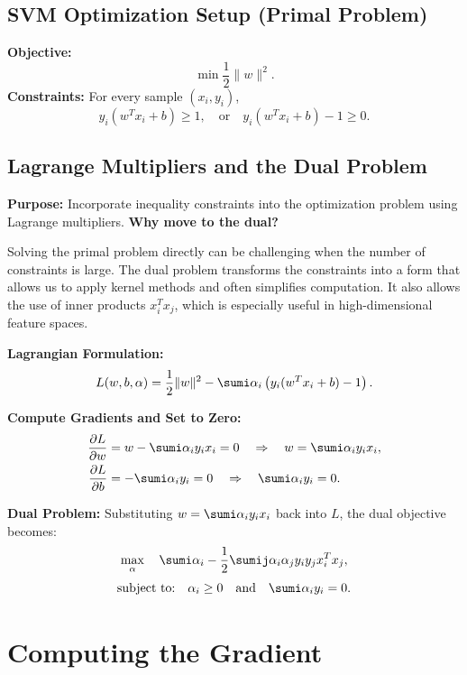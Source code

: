 \subsection{SVM Optimization Setup (Primal Problem)}
\begin{outline}
    \1 \textbf{Objective:}
    \[
    \min \frac{1}{2}\|w\|^2.
    \]
    \1 \textbf{Constraints:} For every sample \((x_i, y_i)\),
    \[
    y_i (w^T x_i + b) \geq 1, \quad \text{or} \quad y_i (w^T x_i + b) - 1 \geq 0.
    \]
\end{outline}

\subsection{Lagrange Multipliers and the Dual Problem}
\begin{outline}
    \1 \textbf{Purpose:} Incorporate inequality constraints into the optimization problem using Lagrange multipliers.
    \1 \textbf{Why move to the dual?}

    Solving the primal problem directly can be challenging when the number of constraints is large. 
    The dual problem transforms the constraints into a form that allows us to apply kernel methods 
    and often simplifies computation. It also allows the use of inner products \( x_i^T x_j \), which is especially useful in high-dimensional feature spaces.

    \1 \textbf{Lagrangian Formulation:}
    \[
    L(w, b, \alpha) = \frac{1}{2}\|w\|^2 - \sumi \alpha_i \left( y_i (w^T x_i + b) - 1 \right).
    \]

    \1 \textbf{Compute Gradients and Set to Zero:}
    \begin{align}
        \frac{\partial L}{\partial w} &= w - \sumi \alpha_i y_i x_i = 0 \quad \Rightarrow \quad w = \sumi \alpha_i y_i x_i, \\
        \frac{\partial L}{\partial b} &= -\sumi \alpha_i y_i = 0 \quad \Rightarrow \quad \sumi \alpha_i y_i = 0.
    \end{align}

    \1 \textbf{Dual Problem:} Substituting \( w = \sumi \alpha_i y_i x_i \) back into \( L \), the dual objective becomes:
    \[
    \max_{\alpha} \quad \sumi \alpha_i - \frac{1}{2} \sumij \alpha_i \alpha_j y_i y_j x_i^T x_j,
    \]
    \[
    \text{subject to:} \quad \alpha_i \geq 0 \quad \text{and} \quad \sumi \alpha_i y_i = 0.
    \]
\end{outline}

\section{Computing the Gradient}

